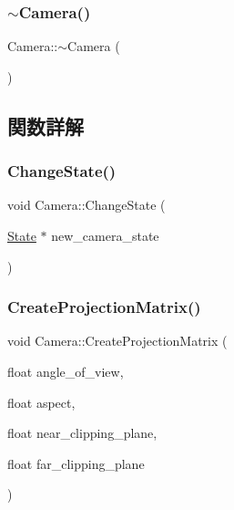 \mbox{\label{class_camera_ad1897942d0ccf91052386388a497349f}} 
\subsubsection{\texorpdfstring{$\sim$\+Camera()}{~Camera()}}
{\footnotesize\ttfamily Camera\+::$\sim$\+Camera (\begin{DoxyParamCaption}{ }\end{DoxyParamCaption})}



\subsection{関数詳解}
\mbox{\label{class_camera_abb88028a49a71e9a6774d58076816dbf}} 
\subsubsection{\texorpdfstring{Change\+State()}{ChangeState()}}
{\footnotesize\ttfamily void Camera\+::\+Change\+State (\begin{DoxyParamCaption}\item[{\mbox{\hyperlink{class_camera_1_1_state}{State}} $\ast$}]{new\+\_\+camera\+\_\+state }\end{DoxyParamCaption})}

\mbox{\label{class_camera_a3d34f1630680d8a8f719121c874a0830}} 
\subsubsection{\texorpdfstring{Create\+Projection\+Matrix()}{CreateProjectionMatrix()}}
{\footnotesize\ttfamily void Camera\+::\+Create\+Projection\+Matrix (\begin{DoxyParamCaption}\item[{float}]{angle\+\_\+of\+\_\+view,  }\item[{float}]{aspect,  }\item[{float}]{near\+\_\+clipping\+\_\+plane,  }\item[{float}]{far\+\_\+clipping\+\_\+plane }\end{DoxyParamCaption})}

